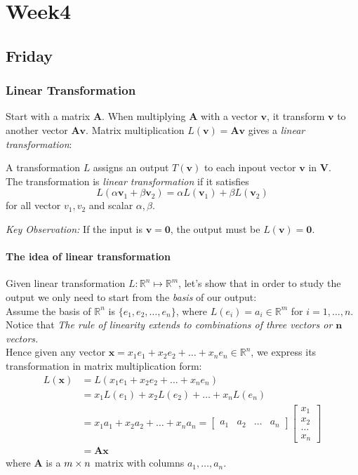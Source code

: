 
\chapter{Week4}

\section{Friday}
\subsection{Linear Transformation}
Start with a matrix $\bm A$. When multiplying $\bm A$ with a vector $\bm v$, it transform $\bm v$ to another vector $\bm{Av}$. Matrix multiplication $L(\bm v) = \bm{Av}$ gives a \emph{linear transformation}:
\begin{definition}
A transformation $L$ assigns an output $T(\bm v)$ to each inpout vector $\bm v$ in $\bm V$.\\
The transformation is \emph{linear transformation} if it satisfies
\[
L(\alpha \bm v_1 + \beta \bm v_2)=\alpha L(\bm v_1)+\beta L(\bm v_2)
\]
for all vector $v_1,v_2$ and scalar $\alpha,\beta$.
\end{definition}
\emph{Key Observation:} If the input is $\bm v = \bm 0$, the output must be $L(\bm v) = \bm 0$.
\subsubsection{The idea of linear transformation}
Given linear transformation $L: \mathbb{R}^{n}\mapsto\mathbb{R}^{m}$, let's show that in order to study the output we only need to start from the \emph{basis} of our output: \\
\enlargethispage{1cm}
Assume the basis of $\mathbb{R}^{n}$ is $\{e_1,e_2,\dots,e_n\}$, where $L(e_i)=a_i\in\mathbb{R}^{m}$ for $i=1,\dots,n$.\\
Notice that \emph{The rule of linearity extends to combinations of three vectors or $\bm n$ vectors.}\\
Hence given any vector $\bm x=x_1e_1+x_2e_2+\dots+x_ne_n\in\mathbb{R}^{n}$, we express its transformation in matrix multiplication form:
\[
\begin{aligned}
L(\bm x) &= L(x_1e_1+x_2e_2+\dots+x_ne_n)\\
			 &= x_1L(e_1)+x_2L(e_2)+\dots+x_nL(e_n)\\
			 &= x_1a_1+x_2a_2+\dots+x_na_n=\begin{bmatrix}
a_1&a_2&\dots&a_n
\end{bmatrix}\begin{bmatrix}
x_1\\x_2\\\dots\\x_n
\end{bmatrix}\\
			 &= \bm{Ax}
\end{aligned}
\]
where $\bm A$ is a $m\times n$ matrix with columns $a_1,\dots,a_n$.\newpage

